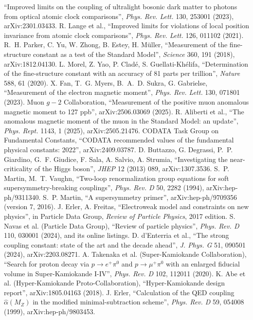 ``Improved limits on the coupling of ultralight bosonic dark matter to photons from optical atomic clock comparisons'', \emph{Phys. Rev.
Lett.} 130, 253001 (2023), arXiv:2301.03433.
 R. Lange et al., ``Improved limits for violations of local position invariance from atomic clock comparisons'',
\emph{Phys. Rev. Lett.} 126, 011102 (2021).
 R.~H. Parker, C. Yu, W. Zhong, B. Estey, H. M\"uller, ``Measurement of the fine-structure constant as a test of the
Standard Model'', \emph{Science} 360, 191 (2018), arXiv:1812.04130.
 L. Morel, Z. Yao, P. Clad\'e, S. Guellati-Kh\'elifa, ``Determination of the fine-structure constant with an accuracy of 81
parts per trillion'', \emph{Nature} 588, 61 (2020).
 X. Fan, T.~G. Myers, B.~A.~D. Sukra, G. Gabrielse, ``Measurement of the electron magnetic moment'', \emph{Phys. Rev. Lett.}
130, 071801 (2023).
 Muon $g-2$ Collaboration, ``Measurement of the positive muon anomalous magnetic moment to 127 ppb'', arXiv:2506.03069
(2025).
 R. Aliberti et al., ``The anomalous magnetic moment of the muon in the Standard Model: an update'', \emph{Phys. Rept.}
1143, 1 (2025), arXiv:2505.21476.
 CODATA Task Group on Fundamental Constants, ``CODATA recommended values of the fundamental physical constants: 2022'',
arXiv:2409.03787.
 D. Buttazzo, G. Degrassi, P.~P. Giardino, G.~F. Giudice, F. Sala, A. Salvio, A. Strumia, ``Investigating the
near-criticality of the Higgs boson'', \emph{JHEP} 12 (2013) 089, arXiv:1307.3536.
 S.~P. Martin, M.~T. Vaughn, ``Two-loop renormalization group equations for soft supersymmetry-breaking couplings'',
\emph{Phys. Rev. D} 50, 2282 (1994), arXiv:hep-ph/9311340.
 S.~P. Martin, ``A supersymmetry primer'', arXiv:hep-ph/9709356 (version 7, 2016).
 J. Erler, A. Freitas, ``Electroweak model and constraints on new physics'', in Particle Data Group, \emph{Review of
Particle Physics}, 2017 edition.
 S. Navas et al. (Particle Data Group), ``Review of particle physics'', \emph{Phys. Rev. D} 110, 030001 (2024), and its
online listings.
 D. d'Enterria et al., ``The strong coupling constant: state of the art and the decade ahead'', \emph{J. Phys. G} 51,
090501 (2024), arXiv:2203.08271.
 A. Takenaka et al. (Super-Kamiokande Collaboration), ``Search for proton decay via $p\to e^+\pi^0$ and $p\to\mu^+\pi^0$
with an enlarged fiducial volume in Super-Kamiokande I-IV'', \emph{Phys. Rev. D} 102, 112011 (2020).
 K. Abe et al. (Hyper-Kamiokande Proto-Collaboration), ``Hyper-Kamiokande design report'', arXiv:1805.04163 (2018).
 J. Erler, ``Calculation of the QED coupling $\hat\alpha(M_Z)$ in the modified minimal-subtraction scheme'', \emph{Phys.
Rev. D} 59, 054008 (1999), arXiv:hep-ph/9803453.

